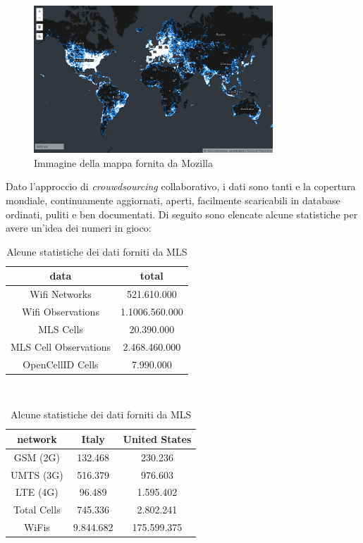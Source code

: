 \begin{figure}[b!]
	\centering
	\includegraphics[width=0.8\textwidth]{./Immagini/Dati/MLSmap.png}
	\caption{Immagine della mappa fornita da Mozilla}
	\label{fig:wapp}
\end{figure}

Dato l'approccio di \emph{crouwdsourcing} collaborativo, i dati sono tanti e la copertura mondiale, continuamente aggiornati, aperti, facilmente scaricabili in database ordinati, puliti e ben documentati. Di seguito sono elencate alcune statistiche per avere un'idea dei numeri in gioco:
\begin{table}[t]
\centering
\caption{Alcune statistiche dei dati forniti da MLS}
\parbox{0.45\textwidth}{
\centering
	\begin{tabular}{cc}
	\toprule
	data 				&total\\
	\midrule
	Wifi Networks 			&521.610.000\\
	Wifi Observations 		&1.1006.560.000\\
	MLS Cells 			&20.390.000\\
	MLS Cell Observations 	&2.468.460.000\\
	OpenCellID Cells 		&7.990.000\\
	\midrule
	\end{tabular}
\label{tab:statacq}
}
\\
\parbox{0.45\textwidth}{
\centering
	\begin{tabular}{ccc}
	network 		&Italy 		&United States\\
	\midrule
	GSM (2G) 		&132.468 		&230.236\\
	UMTS (3G) 	&516.379 		&976.603\\
	LTE (4G) 		&96.489 		&1.595.402\\
	Total Cells 	&745.336 		&2.802.241\\
	WiFis 		&9.844.682 	&175.599.375\\
	\bottomrule
	\end{tabular}
\label{tab:statreg}
}
\label{tab:expectedfluoZnSe}
\end{table}


